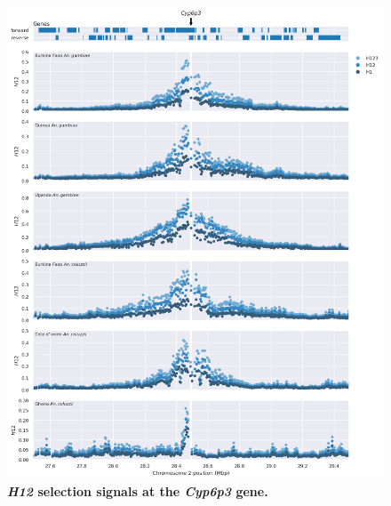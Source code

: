 \documentclass[a4paper,11pt,abstracton,hidelinks]{scrartcl}
\begin{document}
\begin{figure}[t!]
	\begin{center}
		\includegraphics*[width=1.1\linewidth,center]{artwork/locus_cyp6p3_h12.png}
	\end{center}
	\caption[\textit{H12} selection signals at the \textit{Cyp6p3} gene]{
	\textbf{\textit{H12} selection signals at the \textit{Cyp6p3} gene.} 
	} 
	\label{fig:locus_cyp6p3_h12}
\end{figure}


\clearpage
\end{document}
